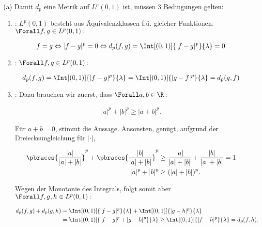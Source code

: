 \begin{solution}

(a)
Damit $d_p$ eine Metrik auf $L^p(0, 1)$ ist, müssen 3 Bedingungen gelten:

\begin{enumerate}[label = (\roman*)]

  \item
  :
  $L^p(0, 1)$ besteht aus Äquivalenzklassen f.ü. gleicher Funktionen. $\Forall f, g \in L^p(0, 1):$

  \begin{align*}
    f = g
    \Leftrightarrow
    |f - g|^p = 0
    \Leftrightarrow
    d_p(f, g)
    =
    \Int[(0, 1)]{|f - g|^p}{\lambda} = 0
  \end{align*}

  \item
  :
  $\Forall f, g \in L^p(0, 1):$

  \begin{align*}
    d_p(f, g)
    =
    \Int[(0, 1)]{|f - g|^p}{\lambda}
    =
    \Int[(0, 1)]{|g - f|^p}{\lambda}
    =
    d_p(g, f)
  \end{align*}

  \item
  :
  Dazu brauchen wir zuerst, dass $\Forall a, b \in \R:$

  \begin{align*}
    |a|^p + |b|^p \geq |a + b|^p.
  \end{align*}

  Für $a + b = 0$, stimmt die Aussage.
  Ansonsten, genügt, aufgrund der Dreiecksungleichung für $|\cdot|$,

  \begin{align*}
    \pbraces{\frac{|a|}{|a| + |b|}}^p +
    \pbraces{\frac{|b|}{|a| + |b|}}^p
    &\geq
    \frac{|a|}{|a| + |b|} +
    \frac{|b|}{|a| + |b|} = 1\\
    |a|^p + |b|^p &\geq (|a| + |b|)^p.
  \end{align*}

  Wegen der Monotonie des Integrals, folgt somit aber $\Forall f, g, h \in L^p(0, 1):$

  \begin{align*}
    d_p(f, g) + d_p(g, h)
    & =
    \Int[(0, 1)]{|f - g|^p}{\lambda} +
    \Int[(0, 1)]{|g - h|^p}{\lambda} \\
    & =
    \Int[(0, 1)]{|f - g|^p + |g - h|^p}{\lambda}
    \geq
    \Int[(0, 1)]{|f - h|^p}{\lambda}
    =
    d_p(f, h).
  \end{align*}


\end{enumerate}
\end{solution}

